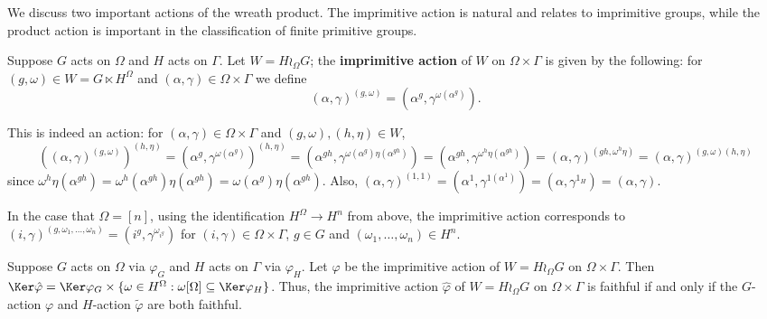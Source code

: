 We discuss two important actions of the wreath product. The imprimitive action is natural and relates to imprimitive groups, while the product action is important in the classification of finite primitive groups. 

\begin{definition}\label{def:imprimitive_action}
    Suppose $G$ acts on $\Omega$ and $H$ acts on $\Gamma$. Let $W = H \wr_\Omega G$; the \textbf{imprimitive action} of $W$ on $\Omega \times \Gamma$ is given by the following: for $(g,\omega) \in W = G \ltimes H^\Omega$ and $(\alpha,\gamma) \in \Omega \times \Gamma$ we define
    $$(\alpha,\gamma)^{(g,\omega)} = (\alpha^g,\gamma^{\omega(\alpha^g)}).$$
\end{definition}

This is indeed an action: for $(\alpha,\gamma) \in \Omega \times \Gamma$ and $(g,\omega),(h,\eta) \in W$,
$$((\alpha,\gamma)^{(g,\omega)})^{(h,\eta)} = (\alpha^g,\gamma^{\omega(\alpha^g)})^{(h,\eta)} = (\alpha^{gh},\gamma^{\omega(\alpha^g)\eta(\alpha^{gh})}) = (\alpha^{gh},\gamma^{\omega^h\eta(\alpha^{gh})}) = (\alpha,\gamma)^{(gh,\omega^h\eta)} = (\alpha,\gamma)^{(g,\omega)(h,\eta)}$$
since $\omega^h\eta(\alpha^{gh}) = \omega^h(\alpha^{gh})\eta(\alpha^{gh}) = \omega(\alpha^g)\eta(\alpha^{gh})$. Also, $(\alpha,\gamma)^{(1,1)} = (\alpha^1,\gamma^{1(\alpha^1)}) = (\alpha,\gamma^{1_H}) = (\alpha,\gamma)$.

In the case that $\Omega = [n]$, using the identification $H^\Omega \to H^n$ from above, the imprimitive action corresponds to $(i,\gamma)^{(g,\omega_1,\dotsc,\omega_n)} = (i^g,\gamma^{\omega_{i^g}})$ for $(i,\gamma) \in \Omega \times \Gamma$, $g \in G$ and $(\omega_1,\dotsc,\omega_n) \in H^n$.

\begin{proposition}
    Suppose $G$ acts on $\Omega$ via $\varphi_G$ and $H$ acts on $\Gamma$ via $\varphi_H$. Let $\hat\varphi$ be the imprimitive action of $W = H \wr_\Omega G$ on $\Omega \times \Gamma$. Then $\Ker\hat\varphi = \Ker\varphi_G \times \{\omega \in H^\Omega : \omega[\Omega] \subseteq \Ker\varphi_H\}$. Thus, the imprimitive action $\hat\varphi$ of $W = H \wr_\Omega G$ on $\Omega \times \Gamma$ is faithful if and only if the $G$-action $\varphi$ and $H$-action $\tilde\varphi$ are both faithful.
\end{proposition}

